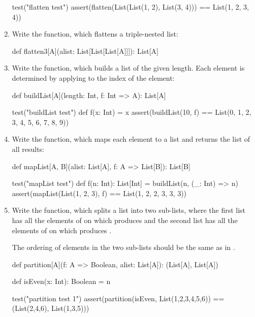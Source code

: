 \begin{enumerate}
\begin{scalacode}
test("flatten test") {
  assert(flatten(List(List(1, 2), List(3, 4))) == List(1, 2, 3, 4))
}
\end{scalacode}

\item
Write the  function, which flattens a triple-nested list:

\begin{scalacode}
def flatten3[A](alist: List[List[List[A]]]): List[A]
\end{scalacode}

\item
Write the  function, which builds a list of the given length. Each
element is determined by applying  to the index of the element:

\begin{scalacode}
def buildList[A](length: Int, f: Int => A): List[A]

test("buildList test") {
  def f(x: Int) = x
  assert(buildList(10, f) == List(0, 1, 2, 3, 4, 5, 6, 7, 8, 9))
}
\end{scalacode}

\item
Write the  function, which maps each element to a list and returns
the list of all results:

\begin{scalacode}
def mapList[A, B](alist: List[A], f: A => List[B]): List[B]

test("mapList test") {
  def f(n: Int): List[Int] = buildList(n, (_: Int) => n)
  assert(mapList(List(1, 2, 3), f) == List(1, 2, 2, 3, 3, 3))
}
\end{scalacode}

\item
Write the  function, which splits a list into
two sub-lists, where the first list has all the elements of 
on which  produces  and the second
list has all the elements of  on which 
produces .

The ordering of elements in the two sub-lists should be the same
as in .

\begin{scalacode}
def partition[A](f: A => Boolean, alist: List[A]): (List[A], List[A])

def isEven(x: Int): Boolean = n %

test("partition test 1") {
  assert(partition(isEven, List(1,2,3,4,5,6)) == (List(2,4,6), List(1,3,5)))
}


\end{scalacode}
\end{enumerate}
